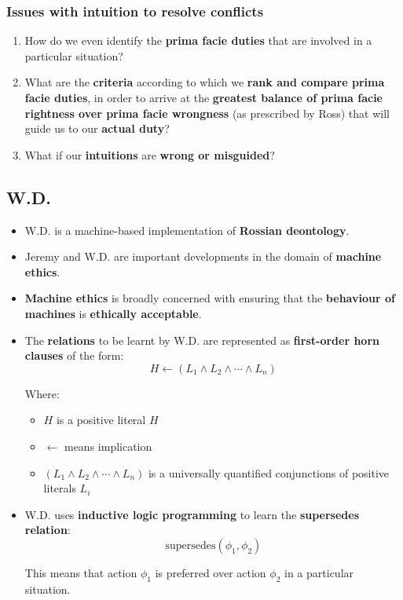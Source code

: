 \documentclass[11pt]{article}
\begin{document}
\subsubsection{Issues with intuition to resolve conflicts}
\label{sec:orgafee4d2}
\begin{enumerate}
\item How do we even identify the \textbf{prima facie duties} that are involved in a particular situation?
\item What are the \textbf{criteria} according to which we \textbf{rank and compare prima facie duties}, in order to arrive at the \textbf{greatest balance of prima facie rightness over prima facie wrongness} (as prescribed by Ross) that will guide us to our \textbf{actual duty}?
\item What if our \textbf{intuitions} are \textbf{wrong or misguided}?
\end{enumerate}
\subsection{W.D.}
\label{sec:org320b7a3}
\begin{itemize}
\item W.D. is a machine-based implementation of \textbf{Rossian deontology}.
\item Jeremy and W.D. are important developments in the domain of \textbf{machine ethics}.
\item \textbf{Machine ethics} is broadly concerned with ensuring that the \textbf{behaviour of machines} is \textbf{ethically acceptable}.
\item The \textbf{relations} to be learnt by W.D. are represented as \textbf{first-order horn clauses} of the form:
\[H \leftarrow (L_1 \wedge L_2 \wedge \cdots \wedge L_n)\]

Where:
\begin{itemize}
\item \(H\) is a positive literal \(H\)
\item \(\leftarrow\) means implication
\item \((L_1 \wedge L_2 \wedge \cdots \wedge L_n)\) is a universally quantified conjunctions of positive literals \(L_i\)
\end{itemize}
\item W.D. uses \textbf{inductive logic programming} to learn the \textbf{supersedes relation}:
\[\text{supersedes}(\phi_1, \phi_2)\]

This means that action \(\phi_1\) is preferred over action \(\phi_2\) in a particular situation.
\end{itemize}
\end{document}
